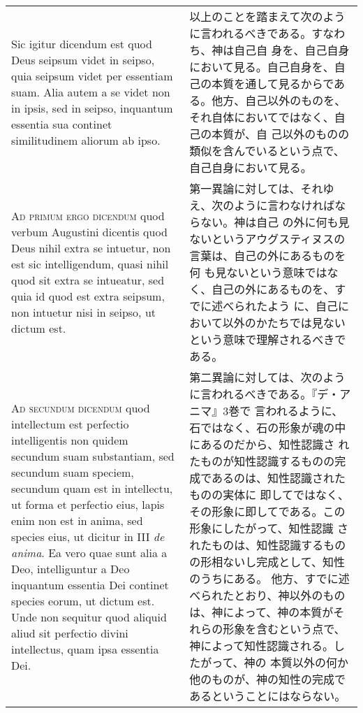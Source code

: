 \documentclass[10pt]{jsarticle} %
\begin{document}
\begin{longtable}{p{21em}p{21em}}
\\

Sic igitur dicendum est quod Deus seipsum videt in seipso, quia
seipsum videt per essentiam suam. Alia autem a se videt non in ipsis,
sed in seipso, inquantum essentia sua continet similitudinem aliorum
ab ipso.

&

以上のことを踏まえて次のように言われるべきである。すなわち、神は自己自
身を、自己自身において見る。自己自身を、自己の本質を通して見るからであ
る。他方、自己以外のものを、それ自体においてではなく、自己の本質が、自
己以外のものの類似を含んでいるという点で、自己自身において見る。



\\


{\scshape Ad primum ergo dicendum} quod verbum Augustini dicentis quod
Deus nihil extra se intuetur, non est sic intelligendum, quasi nihil
quod sit extra se intueatur, sed quia id quod est extra seipsum, non
intuetur nisi in seipso, ut dictum est.


&

第一異論に対しては、それゆえ、次のように言わなければならない。神は自己
の外に何も見ないというアウグスティヌスの言葉は、自己の外にあるものを何
も見ないという意味ではなく、自己の外にあるものを、すでに述べられたよう
に、自己において以外のかたちでは見ないという意味で理解されるべきである。

\\

{\scshape Ad secundum dicendum} quod intellectum est perfectio
intelligentis non quidem secundum suam substantiam, sed secundum suam
speciem, secundum quam est in intellectu, ut forma et perfectio eius,
lapis enim non est in anima, sed species eius, ut dicitur in III
{\itshape de anima}. Ea vero quae sunt alia a Deo, intelliguntur a Deo
inquantum essentia Dei continet species eorum, ut dictum est. Unde non
sequitur quod aliquid aliud sit perfectio divini intellectus, quam
ipsa essentia Dei.


&

第二異論に対しては、次のように言われるべきである。『デ・アニマ』3巻で
言われるように、石ではなく、石の形象が魂の中にあるのだから、知性認識さ
れたものが知性認識するものの完成であるのは、知性認識されたものの実体に
即してではなく、その形象に即してである。この形象にしたがって、知性認識
されたものは、知性認識するものの形相ないし完成として、知性のうちにある。
他方、すでに述べられたとおり、神以外のものは、神によって、神の本質がそ
れらの形象を含むという点で、神によって知性認識される。したがって、神の
本質以外の何か他のものが、神の知性の完成であるということにはならない。



\end{longtable}
\end{document}
